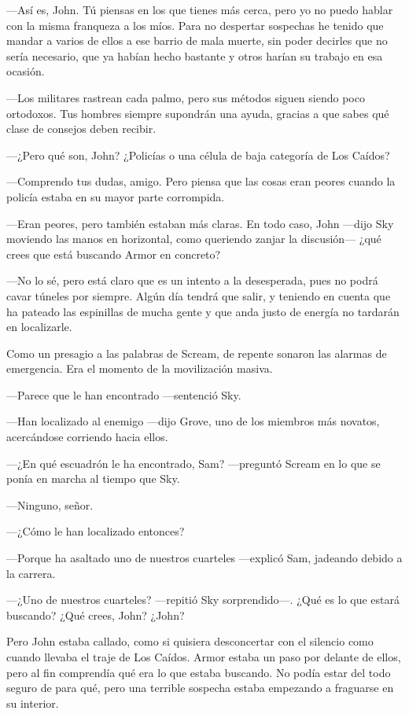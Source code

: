 ---Así es, John. Tú piensas en los que tienes más cerca, pero yo no puedo hablar con la misma franqueza a los míos. Para no despertar sospechas he tenido que mandar a varios de ellos a ese barrio de mala muerte, sin poder decirles que no sería necesario, que ya habían hecho bastante y otros harían su trabajo en esa ocasión.

---Los militares rastrean cada palmo, pero sus métodos siguen siendo poco ortodoxos. Tus hombres siempre supondrán una ayuda, gracias a que sabes qué clase de consejos deben recibir.

---¿Pero qué son, John? ¿Policías o una célula de baja categoría de Los Caídos?

---Comprendo tus dudas, amigo. Pero piensa que las cosas eran peores cuando la policía estaba en su mayor parte corrompida.

---Eran peores, pero también estaban más claras. En todo caso, John ---dijo Sky moviendo las manos en horizontal, como queriendo zanjar la discusión--- ¿qué crees que está buscando Armor en concreto?

---No lo sé, pero está claro que es un intento a la desesperada, pues no podrá cavar túneles por siempre. Algún día tendrá que salir, y teniendo en cuenta que ha pateado las espinillas de mucha gente y que anda justo de energía no tardarán en localizarle.

Como un presagio a las palabras de Scream, de repente sonaron las alarmas de emergencia. Era el momento de la movilización masiva.

---Parece que le han encontrado ---sentenció Sky.

---Han localizado al enemigo ---dijo Grove, uno de los miembros más novatos, acercándose corriendo hacia ellos.

---¿En qué escuadrón le ha encontrado, Sam? ---preguntó Scream en lo que se ponía en marcha al tiempo que Sky.

---Ninguno, señor.

---¿Cómo le han localizado entonces?

---Porque ha asaltado uno de nuestros cuarteles ---explicó Sam, jadeando debido a la carrera.

---¿Uno de nuestros cuarteles? ---repitió Sky sorprendido---. ¿Qué es lo que estará buscando? ¿Qué crees, John? ¿John?

Pero John estaba callado, como si quisiera desconcertar con el silencio como cuando llevaba el traje de Los Caídos. Armor estaba un paso por delante de ellos, pero al fin comprendía qué era lo que estaba buscando. No podía estar del todo seguro de para qué, pero una terrible sospecha estaba empezando a fraguarse en su interior.

